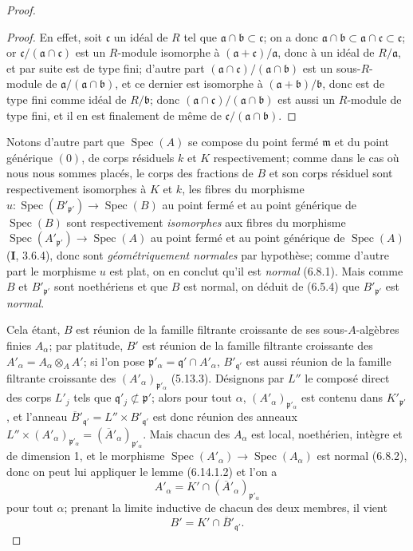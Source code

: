 \begin{proof}
\begin{proof}
En effet, soit $\mathfrak c$ un idéal de $R$ tel que
$\mathfrak a\cap\mathfrak b\subset\mathfrak c$; on a donc
$\mathfrak a\cap\mathfrak b\subset\mathfrak a\cap\mathfrak c\subset
\mathfrak c$; or $\mathfrak c/(\mathfrak a\cap\mathfrak c)$ est un
$R$-module isomorphe à $(\mathfrak a+\mathfrak c)/\mathfrak a$, donc à un
idéal de $R/\mathfrak a$, et par suite est de type fini; d'autre part
$(\mathfrak a\cap\mathfrak c)/(\mathfrak a\cap\mathfrak b)$ est un
sous-$R$-module de $\mathfrak a/(\mathfrak a\cap\mathfrak b)$, et ce
dernier est isomorphe à $(\mathfrak a+\mathfrak b)/\mathfrak b$, donc est
de type fini comme idéal de $R/\mathfrak b$; donc
$(\mathfrak a\cap\mathfrak c)/(\mathfrak a\cap\mathfrak b)$ est aussi un
$R$-module de type fini, et il en est finalement de même de
$\mathfrak c/(\mathfrak a\cap\mathfrak b)$.
\end{proof}

Notons d'autre part que $\operatorname{Spec}(A)$ se compose du point fermé
$\mathfrak m$ et du point générique $(0)$, de corps résiduels $k$ et $K$
respectivement; comme dans le cas où nous nous sommes placés, le corps des
fractions de $B$ et son corps résiduel sont respectivement isomorphes à $K$
et $k$, les fibres du morphisme
$u:\operatorname{Spec}(B'_{\mathfrak p'})\to\operatorname{Spec}(B)$ au
point fermé et au point générique de $\operatorname{Spec}(B)$ sont
respectivement \emph{isomorphes} aux fibres du morphisme
$\operatorname{Spec}(A'_{\mathfrak p'})\to\operatorname{Spec}(A)$ au point
fermé et au point générique de $\operatorname{Spec}(A)$ (\textbf{I}, 3.6.4), donc
sont \emph{géométriquement normales} par hypothèse; comme d'autre part le
morphisme $u$ est plat, on en conclut qu'il est \emph{normal} (6.8.1). Mais comme
$B$ et $B'_{\mathfrak p'}$ sont noethériens et que $B$ est normal, on
déduit de (6.5.4) que $B'_{\mathfrak p'}$ est \emph{normal}.

Cela étant, $B$ est réunion de la famille filtrante croissante de ses
sous-$A$-algèbres finies $A_\alpha$; par platitude, $B'$ est réunion de la
famille filtrante croissante des
$A'_\alpha=A_\alpha\otimes_A A'$; si l'on pose
$\mathfrak p'_\alpha=\mathfrak q'\cap A'_\alpha$,
$B'_{\mathfrak q'}$ est aussi réunion de la famille filtrante croissante
des $(A'_\alpha)_{\mathfrak p'_\alpha}$ (5.13.3). Désignons par $L''$ le
composé direct des corps $L'_j$ tels que
$\mathfrak q'_j\not\subset\mathfrak p'$; alors pour tout $\alpha$,
$(A'_\alpha)_{\mathfrak p'_\alpha}$ est contenu dans
$K'_{\mathfrak p'}$, et l'anneau
$\overline{B}'_{\mathfrak q'}=L''\times B'_{\mathfrak q'}$ est donc réunion
des anneaux
$L''\times(A'_\alpha)_{\mathfrak p'_\alpha}=
(\overline{A}'_\alpha)_{\mathfrak p'_\alpha}$. Mais chacun des $A_\alpha$
est local, noethérien, intègre et de dimension 1, et le morphisme
$\operatorname{Spec}(A'_\alpha)\to\operatorname{Spec}(A_\alpha)$ est
normal (6.8.2), donc on peut lui appliquer le lemme (6.14.1.2) et l'on a
\[
A'_\alpha=K'\cap(\overline{A}'_\alpha)_{\mathfrak p'_\alpha}
\]
pour tout $\alpha$; prenant la limite inductive de chacun des deux membres,
il vient
\[
B'=K'\cap\overline{B}'_{\mathfrak q'}.
\]


\end{proof}
